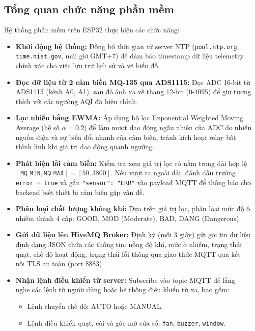 \documentclass[../BTL_PTIT.tex]{subfiles}
\begin{document}
\subsection{Tổng quan chức năng phần mềm}
Hệ thống phần mềm trên ESP32 thực hiện các chức năng:
\begin{itemize}[label=\textbullet]
    \item \textbf{Khởi động hệ thống:} Đồng bộ thời gian từ server NTP (\texttt{pool.ntp.org}, \texttt{time.nist.gov}, múi giờ GMT+7) để đảm bảo timestamp dữ liệu telemetry chính xác cho việc lưu trữ lịch sử và vẽ biểu đồ.
    
    \item \textbf{Đọc dữ liệu từ 2 cảm biến MQ-135 qua ADS1115:} Đọc ADC 16-bit từ ADS1115 (kênh A0, A1), sau đó ánh xạ về thang 12-bit (0-4095) để giữ tương thích với các ngưỡng AQI đã hiệu chỉnh.
    
    \item \textbf{Lọc nhiễu bằng EWMA:} Áp dụng bộ lọc Exponential Weighted Moving Average (hệ số $\alpha = 0.2$) để làm mượt dao động ngẫu nhiên của ADC do nhiễu nguồn điện và sự biến đổi nhanh của cảm biến, tránh kích hoạt relay bất thình lình khi giá trị dao động quanh ngưỡng.
    
    \item \textbf{Phát hiện lỗi cảm biến:} Kiểm tra xem giá trị lọc có nằm trong dải hợp lệ $[\texttt{MQ\_MIN}, \texttt{MQ\_MAX}] = [50, 3800]$. Nếu vượt ra ngoài dải, đánh dấu trường \texttt{error = true} và gắn \texttt{"sensor": "ERR"} vào payload MQTT để thông báo cho backend biết thiết bị cảm biến gặp vấn đề.
    
    \item \textbf{Phân loại chất lượng không khí:} Dựa trên giá trị lọc, phân loại mức độ ô nhiễm thành 4 cấp: GOOD, MOD (Moderate), BAD, DANG (Dangerous).
    
    \item \textbf{Gửi dữ liệu lên HiveMQ Broker:} Định kỳ (mỗi 3 giây) gửi gói tin dữ liệu định dạng JSON chứa các thông tin: nồng độ khí, mức ô nhiễm, trạng thái quạt, chế độ hoạt động, trạng thái lỗi thông qua giao thức MQTT qua kết nối TLS an toàn (port 8883).
    
    \item \textbf{Nhận lệnh điều khiển từ server:} Subscribe vào topic MQTT để lắng nghe các lệnh từ người dùng hoặc hệ thống điều khiển từ xa, bao gồm:
    \begin{itemize}
        \item Lệnh chuyển chế độ: AUTO hoặc MANUAL.
        \item Lệnh điều khiển quạt, còi và góc mở cửa sổ: \texttt{fan}, \texttt{buzzer}, \texttt{window}.
    \end{itemize}
    

\end{itemize}
\end{document}
